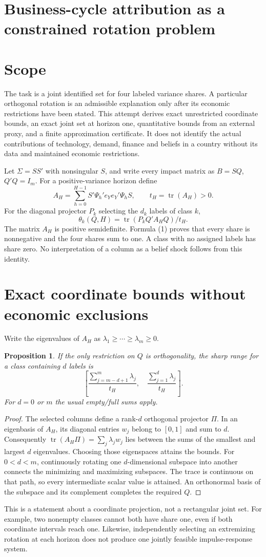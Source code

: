 \documentclass[11pt,a4paper]{article}
\newtheorem{proposition}[theorem]{Proposition}
\begin{document}
\section*{Business-cycle attribution as a constrained rotation problem}
\section{Scope}
The task is a joint identified set for four labeled variance shares. A particular orthogonal rotation is an admissible explanation only after its economic restrictions have been stated. This attempt derives exact unrestricted coordinate bounds, an exact joint set at horizon one, quantitative bounds from an external proxy, and a finite approximation certificate. It does not identify the actual contributions of technology, demand, finance and beliefs in a country without its data and maintained economic restrictions.

Let $\Sigma=SS'$ with nonsingular $S$, and write every impact matrix as $B=SQ$, $Q'Q=I_m$. For a positive-variance horizon define
\[
 A_H=\sum_{h=0}^{H-1}S'\Psi_h'e_Ye_Y'\Psi_hS,\qquad t_H=\operatorname{tr}(A_H)>0.
\]
For the diagonal projector $P_k$ selecting the $d_k$ labels of class $k$,
\[
 \theta_k(Q,H)=\operatorname{tr}(P_kQ'A_HQ)/t_H. \tag{1}
\]
The matrix $A_H$ is positive semidefinite. Formula (1) proves that every share is nonnegative and the four shares sum to one. A class with no assigned labels has share zero. No interpretation of a column as a belief shock follows from this identity.

\section{Exact coordinate bounds without economic exclusions}
Write the eigenvalues of $A_H$ as $\lambda_1\ge\cdots\ge\lambda_m\ge0$.
\begin{proposition}
If the only restriction on $Q$ is orthogonality, the sharp range for a class containing $d$ labels is
\[
 \left[\frac{\sum_{j=m-d+1}^m\lambda_j}{t_H},\quad
       \frac{\sum_{j=1}^d\lambda_j}{t_H}\right]. \tag{2}
\]
For $d=0$ or $m$ the usual empty/full sums apply.
\end{proposition}
\begin{proof}
The selected columns define a rank-$d$ orthogonal projector $\Pi$. In an eigenbasis of $A_H$, its diagonal entries $w_j$ belong to $[0,1]$ and sum to $d$. Consequently $\operatorname{tr}(A_H\Pi)=\sum_j\lambda_jw_j$ lies between the sums of the smallest and largest $d$ eigenvalues. Choosing those eigenspaces attains the bounds. For $0<d<m$, continuously rotating one $d$-dimensional subspace into another connects the minimizing and maximizing subspaces. The trace is continuous on that path, so every intermediate scalar value is attained. An orthonormal basis of the subspace and its complement completes the required $Q$.
\end{proof}
This is a statement about a coordinate projection, not a rectangular joint set. For example, two nonempty classes cannot both have share one, even if both coordinate intervals reach one. Likewise, independently selecting an extremizing rotation at each horizon does not produce one jointly feasible impulse-response system.
\end{document}
